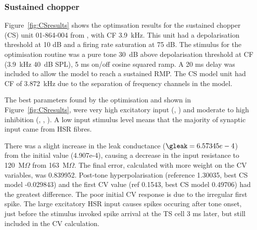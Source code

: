 \subsubsection{Sustained chopper}

Figure~\ref{fig:CSresults} shows the optimsation results for the sustained
chopper (CS) unit 01-864-004 from \citep{PaoliniClareyEtAl:2005}, with CF
3.9~kHz. This unit had a depolarisation threshold at 10 dB and a firing rate
saturation at 75 dB. The stimulus for the optimisation routine was a pure tone
30~dB above depolarisation threshold at CF (3.9~kHz 40~dB SPL), 5 ms on/off
cosine squared ramp.  A 20 ms delay was included to allow the model to reach a
sustained RMP. The CS model unit had CF of 3.872~kHz due to the separation of
frequency channels in the model.

The best parameters found by the optimisation and shown in
Figure~\ref{fig:CSresults}, were very high excitatory input (,
) and moderate to high inhibition (, , ).  A low input stimulus level means that the
majority of synaptic input came from HSR fibres.

There was a slight increase in the leak conductance ($\gleak=6.57345e-4$) from
the initial value (4.907e-4), causing a decrease in the input resistance to
120~M$\Omega$ from 163~M$\Omega$. The final error, calculated with more weight
on the CV variables, was 0.839952.  Post-tone hyperpolarisation (reference
1.30035, best CS model -0.029843) and the first CV value (ref 0.1543, best CS
model 0.49706) had the greatest difference. The poor initial CV response is due
to the irregular first spike.  The large excitatory HSR input causes spikes
occuring after tone onset, just before the stimulus invoked spike arrival at the
TS cell 3 ms later, but still included in the CV calculation.





